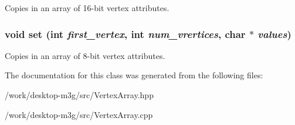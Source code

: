 Copies in an array of 16-bit vertex attributes. \hypertarget{classm3g_1_1VertexArray_31bc745ba40cc25ac73b6b391751fe51}{
\subsubsection[{set}]{\setlength{\rightskip}{0pt plus 5cm}void set (int {\em first\_\-vertex}, \/  int {\em num\_\-vrertices}, \/  char $\ast$ {\em values})}}
\label{classm3g_1_1VertexArray_31bc745ba40cc25ac73b6b391751fe51}


Copies in an array of 8-bit vertex attributes. 

The documentation for this class was generated from the following files:\begin{CompactItemize}
\item 
/work/desktop-m3g/src/VertexArray.hpp\item 
/work/desktop-m3g/src/VertexArray.cpp\end{CompactItemize}
